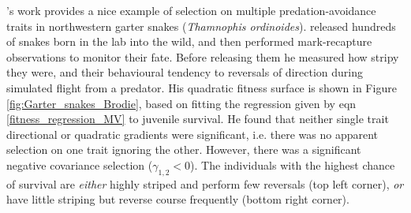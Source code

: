 \citet{brodie1992correlational}'s work provides a nice example of
selection on multiple predation-avoidance traits in northwestern garter snakes
({\it Thamnophis ordinoides}). \citeauthor{brodie1992correlational} released hundreds of snakes born in
the lab into the wild, and then performed mark-recapture observations
to monitor their fate. Before releasing them he measured how stripy
they were, and their behavioural tendency to reversals of direction
during simulated flight from a predator. His quadratic fitness surface is shown in Figure
\ref{fig:Garter_snakes_Brodie}, based on fitting the
regression given by eqn \eqref{fitness_regression_MV} to juvenile
survival. He found that neither single trait directional or quadratic
gradients were significant, i.e. there was no apparent selection on one 
trait ignoring the other. However, there was a significant negative
covariance selection ($\gamma_{1,2}<0$). The individuals with the highest chance of survival are
{\it either} highly striped and perform few reversals (top left
corner), {\it or} have little striping but reverse course frequently
(bottom right corner). 
